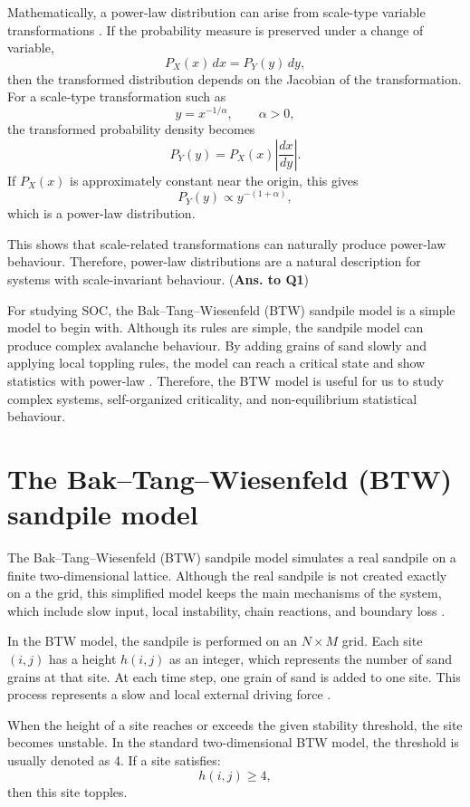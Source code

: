 Mathematically, a power-law distribution can arise from scale-type variable transformations \citep{Sornette2006}. If the probability measure is preserved under a change of variable,
$$
P_X(x)\,dx = P_Y(y)\,dy,
$$
then the transformed distribution depends on the Jacobian of the transformation.
For a scale-type transformation such as
$$
y=x^{-1/\alpha}, \qquad \alpha>0,
$$
the transformed probability density becomes
$$
P_Y(y)=P_X(x)\left|\frac{dx}{dy}\right|.
$$
If \(P_X(x)\) is approximately constant near the origin, this gives
$$
P_Y(y)\propto y^{-(1+\alpha)},
$$
which is a power-law distribution.

This shows that scale-related transformations can naturally produce power-law behaviour. Therefore, power-law distributions are a natural description for systems with scale-invariant behaviour. (\textbf{Ans. to Q1})

For studying SOC, the Bak--Tang--Wiesenfeld (BTW) sandpile model is a simple model to begin with. Although its rules are simple, the sandpile model can produce complex avalanche behaviour. By adding grains of sand slowly and applying local toppling rules, the model can reach a critical state and show statistics with power-law \citep{Bak1987}. Therefore, the BTW model is useful for us to study complex systems, self-organized criticality, and non-equilibrium statistical behaviour.



\section{The Bak–Tang–Wiesenfeld (BTW) sandpile model}

The Bak--Tang--Wiesenfeld (BTW) sandpile model simulates a real sandpile on a finite two-dimensional lattice. Although the real sandpile is not created exactly on a the grid, this simplified model keeps the main mechanisms of the system, which include slow input, local instability, chain reactions, and boundary loss \citep{Bak1987}. 

In the BTW model, the sandpile is performed on an $N \times M$ grid. Each site $(i,j)$ has a height $h(i,j)$ as an integer, which represents the number of sand grains at that site. At each time step, one grain of sand is added to one site. This process represents a slow and local external driving force \citep{Watkins2016}.

When the height of a site reaches or exceeds the given stability threshold, the site becomes unstable. In the standard two-dimensional BTW model, the threshold is usually denoted as 4. If a site satisfies: 
$$
h(i,j) \geq 4,
$$
then this site topples. 

